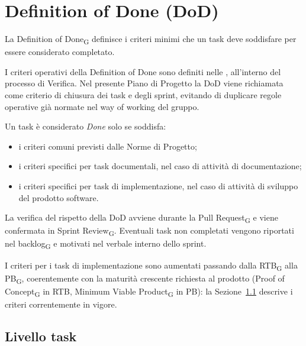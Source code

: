 \section{Definition of Done (DoD)}
\label{sec:dod}

La Definition of Done\textsubscript{G} definisce i criteri minimi che un task deve
soddisfare per essere considerato completato.

I criteri operativi della Definition of Done sono definiti nelle , all'interno del processo di Verifica. Nel presente Piano di Progetto
la DoD viene richiamata come criterio di chiusura dei task e degli sprint,
evitando di duplicare regole operative già normate nel way of working del
gruppo.

Un task è considerato \textit{Done} solo se soddisfa:
\begin{itemize}
\item i criteri comuni previsti dalle Norme di Progetto;
\item i criteri specifici per task documentali, nel caso di attività di
documentazione;
\item i criteri specifici per task di implementazione, nel caso di attività
di sviluppo del prodotto software.
\end{itemize}

La verifica del rispetto della DoD avviene durante la Pull Request\textsubscript{G}
e viene confermata in Sprint Review\textsubscript{G}. Eventuali task non
completati vengono riportati nel backlog\textsubscript{G} e motivati nel
verbale interno dello sprint.

I criteri per i task di implementazione sono aumentati passando dalla RTB\textsubscript{G}
alla PB\textsubscript{G}, coerentemente con la maturità crescente richiesta al
prodotto (Proof of Concept\textsubscript{G} in RTB, Minimum Viable
Product\textsubscript{G} in PB): la Sezione~\ref{sec:dod-task} descrive i
criteri correntemente in vigore.

\subsection{Livello task}
\label{sec:dod-task}

